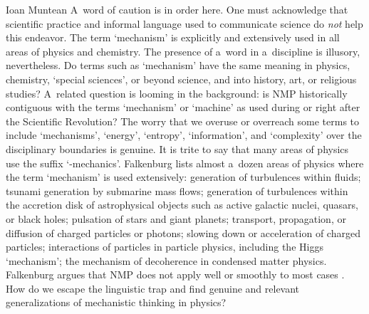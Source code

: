 \begin{recengenv}{Ioan Muntean}
A~word of caution is in order here. One must acknowledge that scientific practice and informal language used to communicate science do \textit{not} help this endeavor. The term ‘mechanism' is explicitly and extensively used in all areas of physics and chemistry. The presence of a~word in a~discipline is illusory, nevertheless. Do terms such as ‘mechanism' have the same meaning in physics, chemistry, ‘special sciences', or beyond science, and into history, art, or religious studies? A~related question is looming in the background: is NMP historically contiguous with the terms ‘mechanism' or ‘machine' as used during or right after the Scientific Revolution? The worry that we overuse or overreach some terms to include ‘mechanisms', ‘energy', ‘entropy', ‘information', and ‘complexity' over the disciplinary boundaries is genuine. It is trite to say that many areas of physics use the suffix ‘-mechanics'. Falkenburg lists almost a~dozen areas of physics where the term ‘mechanism' is used extensively: generation of turbulences within fluids; tsunami generation by submarine mass flows; generation of turbulences within the accretion disk of astrophysical objects such as active galactic nuclei, quasars, or black holes; pulsation of stars and giant planets; transport, propagation, or diffusion of charged particles or photons; slowing down or acceleration of charged particles; interactions of particles in particle physics, including the Higgs ‘mechanism'; the mechanism of decoherence in condensed matter physics. Falkenburg argues that NMP does not apply well or smoothly to most cases
\parencite[][pp.84–85]{falkenburg_mechanistic_2019}. %
 How do we escape the linguistic trap and find genuine and relevant generalizations of mechanistic thinking in physics?


\end{recengenv}
